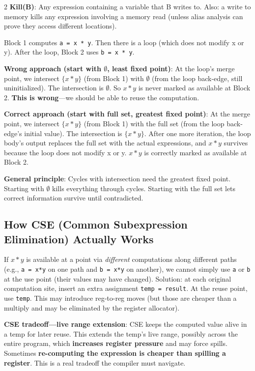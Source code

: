 \documentclass[9pt,landscape]{extarticle}
\begin{document}
\begin{multicols}{2}
\textbf{Kill(B)}: Any expression containing a variable that B writes to. Also: a write to memory kills any expression involving a memory read (unless alias analysis can prove they access different locations).

\begin{exambox}
Block 1 computes \texttt{a = x * y}. Then there is a loop (which does not modify x or y). After the loop, Block 2 uses \texttt{b = x * y}.

\textbf{Wrong approach (start with $\emptyset$, least fixed point)}: At the loop's merge point, we intersect $\{x * y\}$ (from Block 1) with $\emptyset$ (from the loop back-edge, still uninitialized). The intersection is $\emptyset$. So $x * y$ is never marked as available at Block 2. \textbf{This is wrong}---we should be able to reuse the computation.

\textbf{Correct approach (start with full set, greatest fixed point)}: At the merge point, we intersect $\{x * y\}$ (from Block 1) with the full set (from the loop back-edge's initial value). The intersection is $\{x * y\}$. After one more iteration, the loop body's output replaces the full set with the actual expressions, and $x * y$ survives because the loop does not modify x or y. $x * y$ is correctly marked as available at Block 2.

\textbf{General principle}: Cycles with intersection need the greatest fixed point. Starting with $\emptyset$ kills everything through cycles. Starting with the full set lets correct information survive until contradicted.
\end{exambox}

\subsection{How CSE (Common Subexpression Elimination) Actually Works}

If $x * y$ is available at a point via \emph{different} computations along different paths (e.g., \texttt{a = x*y} on one path and \texttt{b = x*y} on another), we cannot simply use \texttt{a} or \texttt{b} at the use point (their values may have changed). Solution: at each original computation site, insert an extra assignment \texttt{temp = result}. At the reuse point, use \texttt{temp}. This may introduce reg-to-reg moves (but those are cheaper than a multiply and may be eliminated by the register allocator).

\textbf{CSE tradeoff---live range extension}: CSE keeps the computed value alive in a temp for later reuse. This extends the temp's live range, possibly across the entire program, which \textbf{increases register pressure} and may force spills. Sometimes \textbf{re-computing the expression is cheaper than spilling a register}. This is a real tradeoff the compiler must navigate.


\end{multicols}
\end{document}
